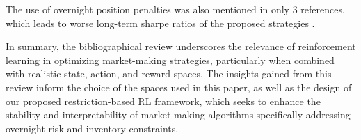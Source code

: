 \begin{figure}[H]
    \centering
\end{figure}

The use of overnight position penalties was also mentioned in only 3 references, which leads to worse long-term sharpe ratios of the proposed strategies \cite{gasperov2021marketmaking}.

In summary, the bibliographical review underscores the relevance of reinforcement learning in optimizing market-making strategies,
particularly when combined with realistic state, action, and reward spaces.
The insights gained from this review inform the choice of the spaces used in this paper, as well as the design of our proposed restriction-based RL framework,
which seeks to enhance the stability and interpretability of market-making algorithms specifically addressing overnight risk and inventory constraints.
